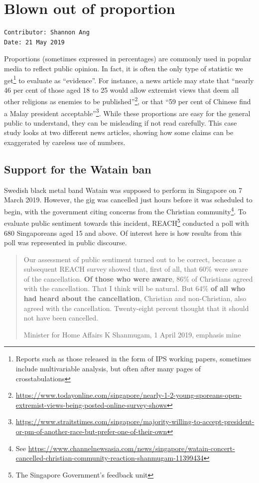 \documentclass[openany]{book}
\let\rmarkdownfootnote\footnote%
\def\footnote{\protect\rmarkdownfootnote}
\begin{document}
\chapter{Blown out of proportion}\label{oop}

\begin{verbatim}
Contributor: Shannon Ang
Date: 21 May 2019
\end{verbatim}

Proportions (sometimes expressed in percentages) are commonly used in
popular media to reflect public opinion. In fact, it is often the only
type of statistic we get\footnote{Reports such as those released in the
  form of IPS working papers, sometimes include multivariable analysis,
  but often after many pages of crosstabulations} to evaluate as
``evidence''. For instance, a news article may state that ``nearly 46
per cent of those aged 18 to 25 would allow extremist views that deem
all other religions as enemies to be published''\footnote{\url{https://www.todayonline.com/singapore/nearly-1-2-young-sporeans-open-extremist-views-being-posted-online-survey-shows}},
or that ``59 per cent of Chinese find a Malay president
acceptable''\footnote{\url{https://www.straitstimes.com/singapore/majority-willing-to-accept-president-or-pm-of-another-race-but-prefer-one-of-their-own}}.
While these proportions are easy for the general public to understand,
they can be misleading if not read carefully. This case study looks at
two different news articles, showing how some claims can be exaggerated
by careless use of numbers.

\section{Support for the Watain ban}\label{watain}

Swedish black metal band Watain was supposed to perform in Singapore on
7 March 2019. However, the gig was cancelled just hours before it was
scheduled to begin, with the government citing concerns from the
Christian community\footnote{See
  \url{https://www.channelnewsasia.com/news/singapore/watain-concert-cancelled-christian-community-reaction-shanmugam-11399434}}.
To evaluate public sentiment towards this incident, REACH\footnote{The
  Singapore Government's feedback unit} conducted a poll with 680
Singaporeans aged 15 and above. Of interest here is how results from
this poll was represented in public discourse.

\begin{quote}
Our assessment of public sentiment turned out to be correct, because a
subsequent REACH survey showed that, first of all, that 60\% were aware
of the cancellation. \textbf{Of those who were aware}, 86\% of
Christians agreed with the cancellation. That I think will be natural.
But 64\% \textbf{of all who had heard about the cancellation}, Christian
and non-Christian, also agreed with the cancellation. Twenty-eight
percent thought that it should not have been cancelled.

Minister for Home Affairs K Shanmugam, 1 April 2019, emphasis mine
\end{quote}
\end{document}
